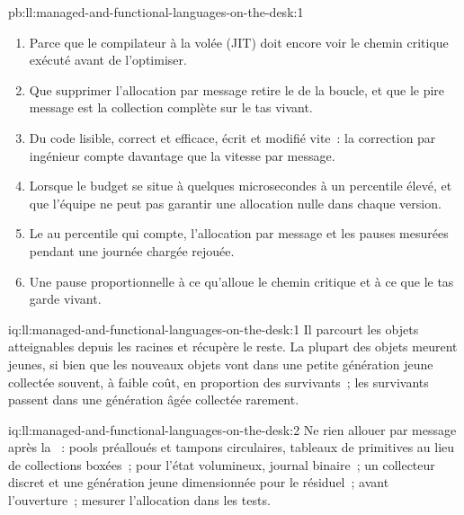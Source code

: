 \begin{solution}{pb:ll:managed-and-functional-languages-on-the-desk:1}
\begin{enumerate}
du démarrage et de la .
\item Parce que le compilateur à la volée (JIT) doit encore voir le chemin critique exécuté avant de l'optimiser.
\item Que supprimer l'allocation par message retire le  de la boucle, et que le pire message est la
collection complète sur le tas vivant.
\item Du code lisible, correct et efficace, écrit et modifié vite~: la correction par ingénieur compte davantage que la vitesse par message.
\item Lorsque le budget se situe à quelques microsecondes à un percentile élevé, et que l'équipe ne peut pas garantir une allocation nulle dans
chaque version.
\item Le  au percentile qui compte, l'allocation par message et les pauses mesurées pendant une
journée chargée rejouée.
\item Une pause proportionnelle à ce qu'alloue le chemin critique et à ce que le tas garde vivant.
\end{enumerate}
\end{solution}

\begin{solution}{iq:ll:managed-and-functional-languages-on-the-desk:1}
Il parcourt les objets atteignables depuis les racines et récupère le reste. La plupart des objets meurent jeunes, si bien que les nouveaux objets vont dans une petite génération jeune
collectée souvent, à faible coût, en proportion des survivants~; les survivants passent dans une génération âgée collectée
rarement.
\end{solution}

\begin{solution}{iq:ll:managed-and-functional-languages-on-the-desk:2}
Ne rien allouer par message après la ~: pools préalloués et tampons circulaires, tableaux de primitives au lieu de
collections boxées~;  pour l'état volumineux, journal binaire~; un collecteur discret et une génération jeune dimensionnée pour le
résiduel~;  avant l'ouverture~; mesurer l'allocation dans les tests.
\end{solution}


